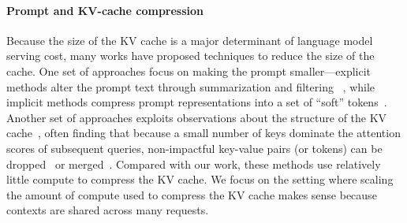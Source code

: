 \paragraph{Prompt and KV-cache compression} Because the size of the KV cache is a major determinant of language model serving cost, many works have proposed techniques to reduce the size of the cache. One set of approaches focus on making the prompt smaller---explicit methods alter the prompt text through summarization and filtering ~\cite{jiang2023llmlingua,li2023unlocking,chuang2024learning,zhang2024adacomp,pan2024llmlingua}, while implicit methods compress prompt representations into a set of ``soft'' tokens~\cite{chevalier2023adapting,yen2024long,ge2023context,mu2023learning,qin2023dodo, lester2021power}. Another set of approaches exploits observations about the structure of the KV cache~\cite{yu2024effectively,chang2024palu,kim2024lexico}, often finding that because a small number of keys dominate the attention scores of subsequent queries, non-impactful key-value pairs (or tokens) can be dropped~\cite{ge2023model,zhang2023h2o,tang2024quest,oren2024transformers, li2024snapkv} or merged~\cite{wang2024model,zhang2024cam,wan2024d2o}.
Compared with our work, these methods use relatively little compute to compress the KV cache. We focus on the setting where scaling the amount of compute used to compress the KV cache makes sense because contexts are shared across many requests.
\vspace{-1mm}
